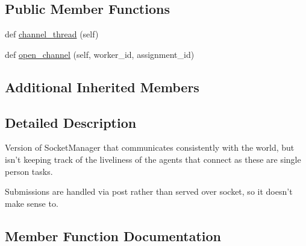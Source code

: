 \subsection*{Public Member Functions}
\begin{DoxyCompactItemize}
\item 
def \hyperlink{classparlai_1_1mturk_1_1core_1_1legacy__2018_1_1socket__manager_1_1StaticSocketManager_ab218ec2b7d77feca516140e8b64f769e}{channel\+\_\+thread} (self)
\item 
def \hyperlink{classparlai_1_1mturk_1_1core_1_1legacy__2018_1_1socket__manager_1_1StaticSocketManager_ac5de566ae19796033224e18fdd86e5b9}{open\+\_\+channel} (self, worker\+\_\+id, assignment\+\_\+id)
\end{DoxyCompactItemize}
\subsection*{Additional Inherited Members}


\subsection{Detailed Description}
\begin{DoxyVerb}Version of SocketManager that communicates consistently with the world, but isn't
keeping track of the liveliness of the agents that connect as these are single
person tasks.

Submissions are handled via post rather than served over socket, so it doesn't make
sense to.
\end{DoxyVerb}
 

\subsection{Member Function Documentation}
\mbox{\label{classparlai_1_1mturk_1_1core_1_1legacy__2018_1_1socket__manager_1_1StaticSocketManager_ab218ec2b7d77feca516140e8b64f769e}} 
